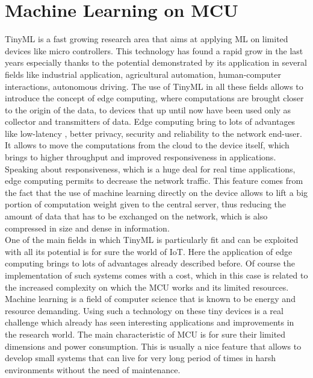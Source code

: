\documentclass[12pt]{report}
\begin{document}
\section{Machine Learning on MCU}
TinyML is a fast growing research area that aims at applying ML on limited devices like micro controllers. This technology has found a rapid grow in the last years especially thanks to the potential demonstrated by its application in several fields like industrial application, agricultural automation, human-computer interactions, autonomous driving. The use of TinyML in all these fields allows to introduce the concept of edge computing, where computations are brought closer to the origin of the data, to devices that up until now have been used only as collector and transmitters of data. Edge computing bring to lots of advantages like low-latency , better privacy, security and reliability to the network end-user. It allows to move the computations from the cloud to the device itself, which brings to higher throughput and improved responsiveness in applications. Speaking about responsiveness, which is a huge deal for real time applications, edge computing permits to decrease the network traffic. This feature comes from the fact that the use of machine learning directly on the device allows to lift a big portion of computation weight given to the central server, thus reducing the amount of data that has to be exchanged on the network, which is also compressed in size and dense in information. \\
One of the main fields in which TinyML is particularly fit and can be exploited with all its potential is for sure the world of IoT. Here the application of edge computing brings to lots of advantages already described before. Of course the implementation of such systems comes with a cost, which in this case is related to the increased complexity on which the MCU works and its limited resources. Machine learning is a field of computer science that is known to be energy and resource demanding. Using such a technology on these tiny devices is a real challenge which already has seen interesting applications and improvements in the research world. The main characteristic of MCU is for sure their limited dimensions and power consumption. This is usually a nice feature that allows to develop small systems that can live for very long period of times in harsh environments without the need of maintenance. 
\end{document}
